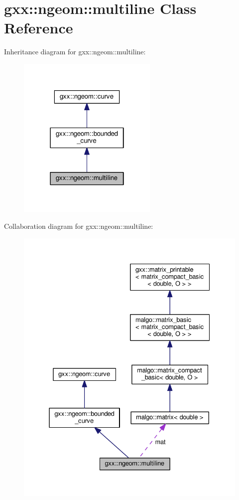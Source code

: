 \hypertarget{classgxx_1_1ngeom_1_1multiline}{}\section{gxx\+:\+:ngeom\+:\+:multiline Class Reference}
\label{classgxx_1_1ngeom_1_1multiline}


Inheritance diagram for gxx\+:\+:ngeom\+:\+:multiline\+:
\nopagebreak
\begin{figure}[H]
\begin{center}
\leavevmode
\includegraphics[width=190pt]{classgxx_1_1ngeom_1_1multiline__inherit__graph}
\end{center}
\end{figure}


Collaboration diagram for gxx\+:\+:ngeom\+:\+:multiline\+:
\nopagebreak
\begin{figure}[H]
\begin{center}
\leavevmode
\includegraphics[width=331pt]{classgxx_1_1ngeom_1_1multiline__coll__graph}
\end{center}
\end{figure}
